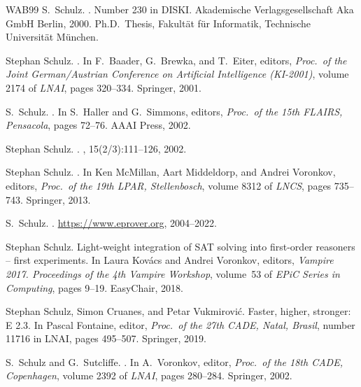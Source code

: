 \documentclass{report}
\begin{document}
\begin{thebibliography}{WAB{\etalchar{+}}99}
S.~Schulz.
.
\newblock Number 230 in DISKI. Akademische Verlagsgesellschaft Aka GmbH Berlin,
  2000.
\newblock Ph.D.~Thesis, Fakult{\"a}t f{\"u}r Informatik, Technische
  Universit{\"a}t M{\"u}nchen.

Stephan Schulz.
.
\newblock In F.~Baader, G.~Brewka, and T.~Eiter, editors, {\em Proc.\ of the
  Joint German/Austrian Conference on Artificial Intelligence (KI-2001)},
  volume 2174 of {\em LNAI}, pages 320--334. Springer, 2001.

S.~Schulz.
.
\newblock In S.~Haller and G.~Simmons, editors, {\em Proc.\ of the 15th FLAIRS,
  Pensacola}, pages 72--76. AAAI Press, 2002.

Stephan Schulz.
.
, 15(2/3):111--126, 2002.

Stephan Schulz.
.
\newblock In Ken McMillan, Aart Middeldorp, and Andrei Voronkov, editors, {\em
  Proc.\ of the 19th LPAR, Stellenbosch}, volume 8312 of {\em LNCS}, pages
  735--743. Springer, 2013.

S.~Schulz.
.
\newblock \url{https://www.eprover.org}, 2004--2022.

Stephan Schulz.
\newblock Light-weight integration of {SAT} solving into first-order reasoners
  -- first experiments.
\newblock In Laura Kov{\'a}cs and Andrei Voronkov, editors, {\em Vampire 2017.
  Proceedings of the 4th Vampire Workshop}, volume~53 of {\em EPiC Series in
  Computing}, pages 9--19. EasyChair, 2018.

Stephan Schulz, Simon Cruanes, and Petar Vukmirovi{\'c}.
\newblock Faster, higher, stronger: {E} 2.3.
\newblock In Pascal Fontaine, editor, {\em Proc.\ of the 27th CADE, Natal,
  Brasil}, number 11716 in LNAI, pages 495--507. Springer, 2019.

S.~Schulz and G.~Sutcliffe.
.
\newblock In A.~Voronkov, editor, {\em Proc.\ of the 18th CADE, Copenhagen},
  volume 2392 of {\em LNAI}, pages 280--284. Springer, 2002.


\end{thebibliography}
\end{document}
